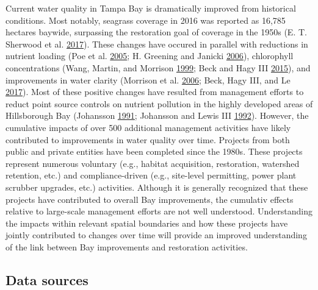 \documentclass[]{article}
\begin{document}
Current water quality in Tampa Bay is dramatically improved from
historical conditions. Most notably, seagrass coverage in 2016 was
reported as 16,785 hectares baywide, surpassing the restoration goal of
coverage in the 1950s (E. T. Sherwood et al.
\protect\hyperlink{ref-Sherwood17}{2017}). These changes have occured in
parallel with reductions in nutrient loading (Poe et al.
\protect\hyperlink{ref-Poe05}{2005}; H. Greening and Janicki
\protect\hyperlink{ref-Greening06}{2006}), chlorophyll concentrations
(Wang, Martin, and Morrison \protect\hyperlink{ref-Wang99}{1999}; Beck
and Hagy III \protect\hyperlink{ref-Beck15}{2015}), and improvements in
water clarity (Morrison et al. \protect\hyperlink{ref-Morrison06}{2006};
Beck, Hagy III, and Le \protect\hyperlink{ref-Beck17c}{2017}). Most of
these positive changes have resulted from management efforts to reduct
point source controls on nutrient pollution in the highly developed
areas of Hillsborough Bay (Johansson
\protect\hyperlink{ref-Johansson91}{1991}; Johansson and Lewis III
\protect\hyperlink{ref-Johansson92}{1992}). However, the cumulative
impacts of over 500 additional management activities have likely
contributed to improvements in water quality over time. Projects from
both public and private entities have been completed since the 1980s.
These projects represent numerous voluntary (e.g., habitat acquisition,
restoration, watershed retention, etc.) and compliance-driven (e.g.,
site-level permitting, power plant scrubber upgrades, etc.) activities.
Although it is generally recognized that these projects have contributed
to overall Bay improvements, the cumulativ effects relative to
large-scale management efforts are not well understood. Understanding
the impacts within relevant spatial boundaries and how these projects
have jointly contributed to changes over time will provide an improved
understanding of the link between Bay improvements and restoration
activities.

\subsection{Data sources}\label{data-sources}
\end{document}
